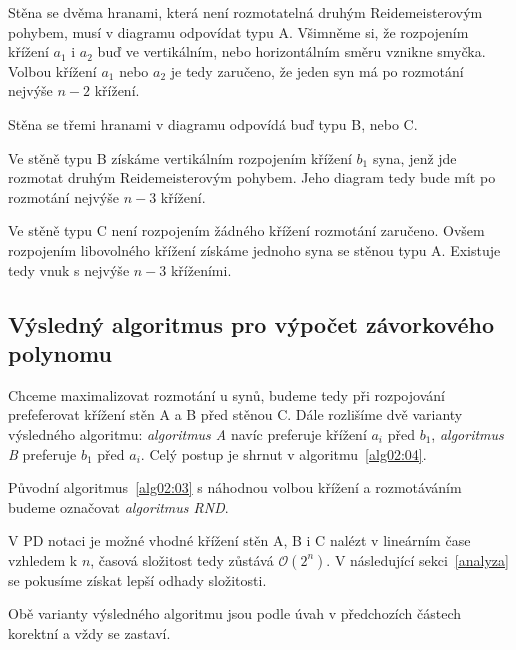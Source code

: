 Stěna se dvěma hranami, která není rozmotatelná druhým Reidemeisterovým pohybem, musí v diagramu odpovídat typu A. Všimněme si, že rozpojením křížení $a_1$ i $a_2$ buď ve vertikálním, nebo horizontálním směru vznikne smyčka. Volbou křížení $a_1$ nebo $a_2$ je tedy zaručeno, že jeden syn má po rozmotání nejvýše $n-2$ křížení.

Stěna se třemi hranami v diagramu odpovídá buď typu B, nebo C.

Ve stěně typu B získáme vertikálním rozpojením křížení $b_1$ syna, jenž jde rozmotat druhým Reidemeisterovým pohybem. Jeho diagram tedy bude mít po rozmotání nejvýše $n-3$ křížení.

Ve stěně typu C není rozpojením žádného křížení rozmotání zaručeno. Ovšem rozpojením libovolného křížení získáme jednoho syna se stěnou typu A. Existuje tedy vnuk s nejvýše $n-3$ kříženími.

\subsection{Výsledný algoritmus pro výpočet závorkového polynomu} \label{varianty}
Chceme maximalizovat rozmotání u synů, budeme tedy při rozpojování prefeferovat křížení stěn A a B před stěnou C. Dále rozlišíme dvě varianty výsledného algoritmu: \emph{algoritmus A} navíc preferuje křížení $a_i$ před $b_1$,  \emph{algoritmus B} preferuje $b_1$ před $a_i$. Celý postup je shrnut v algoritmu~\ref{alg02:04}.

Původní algoritmus~\ref{alg02:03} s náhodnou volbou křížení a rozmotáváním budeme označovat \emph{algoritmus RND}.

V PD notaci je možné vhodné křížení stěn A, B i C nalézt v lineárním čase vzhledem k $n$, časová složitost tedy zůstává $\mathcal{O}(2^n)$. V následující sekci~\ref{analyza} se pokusíme získat lepší odhady složitosti.

Obě varianty výsledného algoritmu jsou podle úvah v předchozích částech korektní a vždy se zastaví.

